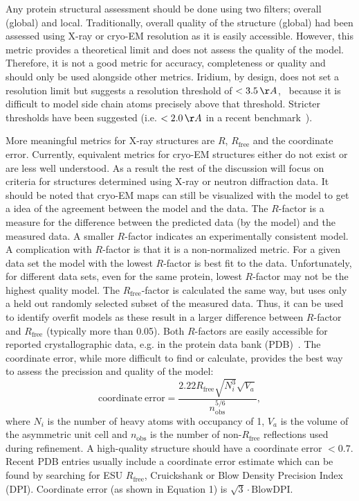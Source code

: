 \documentclass[9pt,bestpractices]{livecoms}
\begin{document}
Any protein structural assessment should be done using two filters; overall (global) and local. Traditionally, overall quality of the structure (global) had been assessed using X-ray or cryo-EM resolution as it is easily accessible.
%
However, this metric provides a theoretical limit and does not assess the quality of the model. Therefore, it is not a good metric for accuracy, completeness or quality and should only be used alongside other metrics. Iridium, by design, does not set a resolution limit but suggests a resolution threshold of $< 3.5\,\AA$,~\cite{warrenEssentialConsiderationsUsing2012} because it is difficult to model side chain atoms precisely above that threshold. Stricter thresholds have been suggested (i.e. $<2.0\,\AA$  in a recent benchmark~\cite{schindler_largescale_2020}).

More meaningful metrics for X-ray structures are $R$, $R_{\mathrm{free}}$ and the coordinate error. Currently, equivalent metrics for cryo-EM structures either do not exist or are less well understood.  As a result the rest of the discussion will focus on criteria for structures determined using X-ray or neutron diffraction data.  It should be noted that cryo-EM maps can still be visualized with the model to get a idea of the agreement between the model and the data.
%
The $R$-factor is a measure for the difference between the predicted data (by the model) and the measured data. A smaller $R$-factor indicates an experimentally consistent model. A complication with $R$-factor is that it is a non-normalized metric. For a given data set the model with the lowest $R$-factor is best fit to the data.  Unfortunately, for different data sets, even for the same protein, lowest $R$-factor may not be the highest quality model. 
%
The $R_{\mathrm{free}}$-factor is calculated the same way, but uses only a held out randomly selected subset of the measured data. Thus, it can be used to identify overfit models as these result in a larger difference between $R$-factor and $R_{\mathrm{free}}$ (typically more than 0.05).
Both $R$-factors are easily accessible for reported crystallographic data, e.g. in the protein data bank (PDB)~\cite{bermanProteinDataBank2000}. 
%
The coordinate error, while more difficult to find or calculate, provides the best way to assess the precission and quality of the model:
%
\begin{equation}
    \mathrm{coordinate\ error} = \frac{2.22 R_{\mathrm{free}}\sqrt{N_i^3}\sqrt{V_a}} {n_{\mathrm{obs}}^{5/6}},
    \label{eq:coordinate_error}
\end{equation}
%
where $N_i$ is the number of heavy atoms with occupancy of 1, $V_a$ is the volume of the asymmetric unit cell and $n_{\mathrm{obs}}$ is the number of non-$R_{\mathrm{free}}$ reflections used during refinement. A high-quality structure should have a coordinate error $<0.7$. Recent PDB entries usually include a coordinate error estimate which can be found by searching for ESU $R_{\mathrm{free}}$, Cruickshank or Blow Density Precision Index (DPI). Coordinate error (as shown in Equation 1) is $\sqrt{3}\cdot \mathrm{BlowDPI}$. 
\end{document}
